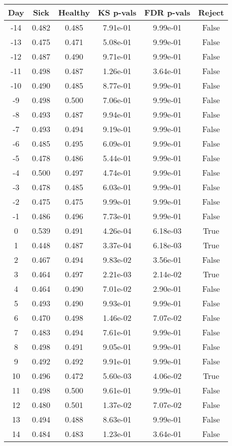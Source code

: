 \begin{tabular}{c|c|c|c|c|c}
Day &  Sick & Healthy &  KS p-vals & FDR p-vals & Reject\\
\hline
-14 & 0.482 &   0.485 &   7.91e-01 &   9.99e-01 &  False\\
-13 & 0.475 &   0.471 &   5.08e-01 &   9.99e-01 &  False\\
-12 & 0.487 &   0.490 &   9.71e-01 &   9.99e-01 &  False\\
-11 & 0.498 &   0.487 &   1.26e-01 &   3.64e-01 &  False\\
-10 & 0.490 &   0.485 &   8.77e-01 &   9.99e-01 &  False\\
 -9 & 0.498 &   0.500 &   7.06e-01 &   9.99e-01 &  False\\
 -8 & 0.493 &   0.487 &   9.94e-01 &   9.99e-01 &  False\\
 -7 & 0.493 &   0.494 &   9.19e-01 &   9.99e-01 &  False\\
 -6 & 0.485 &   0.495 &   6.09e-01 &   9.99e-01 &  False\\
 -5 & 0.478 &   0.486 &   5.44e-01 &   9.99e-01 &  False\\
 -4 & 0.500 &   0.497 &   4.74e-01 &   9.99e-01 &  False\\
 -3 & 0.478 &   0.485 &   6.03e-01 &   9.99e-01 &  False\\
 -2 & 0.475 &   0.475 &   9.99e-01 &   9.99e-01 &  False\\
 -1 & 0.486 &   0.496 &   7.73e-01 &   9.99e-01 &  False\\
  0 & 0.539 &   0.491 &   4.26e-04 &   6.18e-03 &   True\\
  1 & 0.448 &   0.487 &   3.37e-04 &   6.18e-03 &   True\\
  2 & 0.467 &   0.494 &   9.83e-02 &   3.56e-01 &  False\\
  3 & 0.464 &   0.497 &   2.21e-03 &   2.14e-02 &   True\\
  4 & 0.464 &   0.490 &   7.01e-02 &   2.90e-01 &  False\\
  5 & 0.493 &   0.490 &   9.93e-01 &   9.99e-01 &  False\\
  6 & 0.470 &   0.498 &   1.46e-02 &   7.07e-02 &  False\\
  7 & 0.483 &   0.494 &   7.61e-01 &   9.99e-01 &  False\\
  8 & 0.498 &   0.491 &   9.05e-01 &   9.99e-01 &  False\\
  9 & 0.492 &   0.492 &   9.91e-01 &   9.99e-01 &  False\\
 10 & 0.496 &   0.472 &   5.60e-03 &   4.06e-02 &   True\\
 11 & 0.498 &   0.500 &   9.61e-01 &   9.99e-01 &  False\\
 12 & 0.480 &   0.501 &   1.37e-02 &   7.07e-02 &  False\\
 13 & 0.494 &   0.488 &   8.63e-01 &   9.99e-01 &  False\\
 14 & 0.484 &   0.483 &   1.23e-01 &   3.64e-01 &  False\\
\end{tabular}
